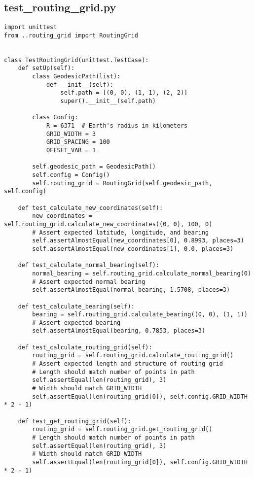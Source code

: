 \subsection{test_routing_grid.py}
\begin{verbatim}
import unittest
from ..routing_grid import RoutingGrid


class TestRoutingGrid(unittest.TestCase):
    def setUp(self):
        class GeodesicPath(list):
            def __init__(self):
                self.path = [(0, 0), (1, 1), (2, 2)]
                super().__init__(self.path)

        class Config:
            R = 6371  # Earth's radius in kilometers
            GRID_WIDTH = 3
            GRID_SPACING = 100
            OFFSET_VAR = 1

        self.geodesic_path = GeodesicPath()
        self.config = Config()
        self.routing_grid = RoutingGrid(self.geodesic_path, self.config)

    def test_calculate_new_coordinates(self):
        new_coordinates = self.routing_grid.calculate_new_coordinates((0, 0), 100, 0)
        # Assert expected latitude, longitude, and bearing
        self.assertAlmostEqual(new_coordinates[0], 0.8993, places=3)
        self.assertAlmostEqual(new_coordinates[1], 0.0, places=3)

    def test_calculate_normal_bearing(self):
        normal_bearing = self.routing_grid.calculate_normal_bearing(0)
        # Assert expected normal bearing
        self.assertAlmostEqual(normal_bearing, 1.5708, places=3)

    def test_calculate_bearing(self):
        bearing = self.routing_grid.calculate_bearing((0, 0), (1, 1))
        # Assert expected bearing
        self.assertAlmostEqual(bearing, 0.7853, places=3)

    def test_calculate_routing_grid(self):
        routing_grid = self.routing_grid.calculate_routing_grid()
        # Assert expected length and structure of routing grid
        # Length should match number of points in path
        self.assertEqual(len(routing_grid), 3)
        # Width should match GRID_WIDTH
        self.assertEqual(len(routing_grid[0]), self.config.GRID_WIDTH * 2 - 1)

    def test_get_routing_grid(self):
        routing_grid = self.routing_grid.get_routing_grid()
        # Length should match number of points in path
        self.assertEqual(len(routing_grid), 3)
        # Width should match GRID_WIDTH
        self.assertEqual(len(routing_grid[0]), self.config.GRID_WIDTH * 2 - 1)

\end{verbatim}
